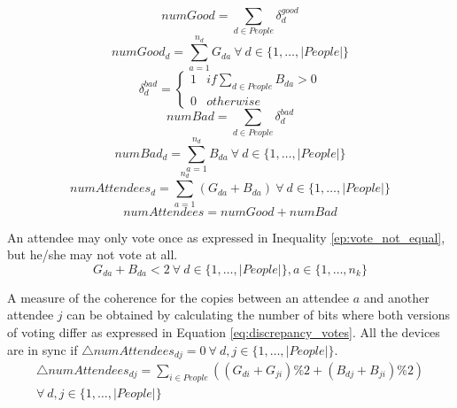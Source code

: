 \begin{equation} \label{eq:total_good_votes}
	numGood  = \sum_{d \in People} \delta^{good}_{d}
\end{equation}
\begin{equation} \label{eq:local_total_good_votes}
	numGood_{d}  = \sum^{n_{d}}_{a=1} G_{da} ~ \forall ~ d \in \{1,\dots, |People|\}
\end{equation}
\begin{equation} \label{attendee_voted_bad}
	\delta^{bad}_{d} = \left\{\begin{array}{ll}
		1 & if \sum_{d \in People} B_{da} > 0\\
		0 & otherwise
	\end{array}
	\right.
\end{equation}
\begin{equation} \label{eq:total_bad_votes}
	numBad  = \sum_{d \in People} \delta^{bad}_{d}
\end{equation}
\begin{equation} \label{eq:local_total_bad_votes}
	numBad_{d}  = \sum^{n_{d}}_{a=1} B_{da} ~ \forall ~ d \in \{1,\dots, |People|\}
\end{equation}
\begin{equation} \label{eq:num_votes}
	numAttendees_{d}  = \sum^{n_{d}}_{a=1} (G_{da} + B_{da}) ~ \forall ~ d \in \{1,\dots, |People|\}
\end{equation}
\begin{equation} \label{eq:total_num_votes}
	numAttendees  = numGood + numBad
\end{equation}

An attendee may only vote once as expressed in Inequality \ref{ep:vote_not_equal}, but he/she may not vote at all.
\begin{equation} \label{ep:vote_not_equal}
	G_{da} + B_{da} < 2 ~ \forall ~ d \in \{1,\dots, |People|\}, a \in \{1,\dots, n_{k}\}
\end{equation}

A measure of the coherence for the copies between an attendee $a$ and another attendee $j$ can be obtained by calculating the number of bits where both versions of voting differ as expressed in Equation \ref{eq:discrepancy_votes}. All the devices are in sync if $\bigtriangleup numAttendees_{dj} = 0 ~ \forall ~ d, j \in \{1,\dots, |People|\}$.
\begin{multline} \label{eq:discrepancy_votes}
	\bigtriangleup numAttendees_{dj} = \sum_{i \in People} ((G_{di} + G_{ji}) \% 2 + (B_{dj} + B_{ji}) \% 2)\\ \forall ~ d, j \in \{1,\dots, |People|\}
\end{multline}

